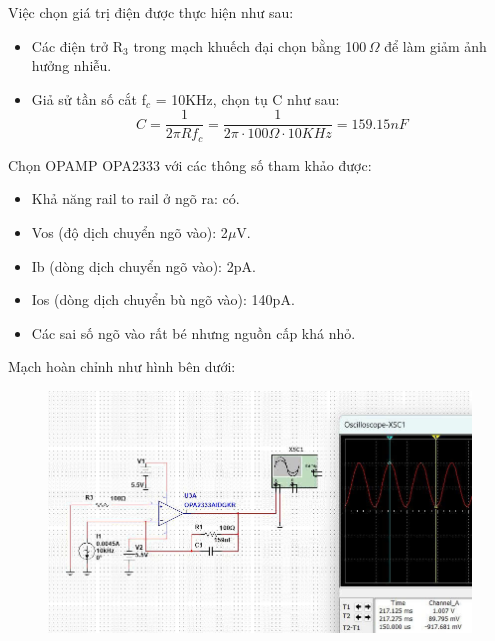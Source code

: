 Việc chọn giá trị điện được thực hiện như sau:
\begin{itemize}
    \item Các điện trở R$_3$ trong mạch khuếch đại chọn bằng 100\,$\Omega$ để làm giảm ảnh hưởng nhiễu.
    \item Giả sử tần số cắt f$_c$ = 10KHz, chọn tụ C như sau:
    \begin{equation*}
        C = \dfrac{1}{2\pi R f_c} = \dfrac{1}{2\pi \cdot 100\Omega \cdot 10KHz} = 159.15n F
    \end{equation*}
\end{itemize}

Chọn OPAMP OPA2333 với các thông số tham khảo được:
\begin{itemize}
    \item Khả năng rail to rail ở ngõ ra: có.
    \item Vos (độ dịch chuyển ngõ vào): 2$\mu$V.
    \item Ib (dòng dịch chuyển ngõ vào): 2pA.
    \item Ios (dòng dịch chuyển bù ngõ vào): 140pA.
    \item Các sai số ngõ vào rất bé nhưng nguồn cấp khá nhỏ.
\end{itemize}
Mạch hoàn chỉnh như hình bên dưới:
\begin{figure}[H]
    \centering
    \includegraphics[scale=0.5]{image/C7.jpg}
\end{figure}